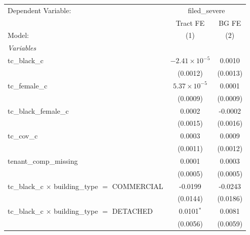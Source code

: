 \begin{tabular}{lcc}
   \tabularnewline \midrule \midrule
   Dependent Variable: & \multicolumn{2}{c}{filed\_severe}\\
                                                                       & Tract FE               & BG FE \\   
   Model:                                                              & (1)                    & (2)\\  
   \midrule
   \emph{Variables}\\
   tc\_black\_c                                                        & $-2.41\times 10^{-5}$  & 0.0010\\   
                                                                       & (0.0012)               & (0.0013)\\   
   tc\_female\_c                                                       & $5.37\times 10^{-5}$   & 0.0001\\   
                                                                       & (0.0009)               & (0.0009)\\   
   tc\_black\_female\_c                                                & 0.0002                 & -0.0002\\   
                                                                       & (0.0015)               & (0.0016)\\   
   tc\_cov\_c                                                          & 0.0003                 & 0.0009\\   
                                                                       & (0.0011)               & (0.0012)\\   
   tenant\_comp\_missing                                               & 0.0001                 & 0.0003\\   
                                                                       & (0.0005)               & (0.0005)\\   
   tc\_black\_c $\times$ building\_type $=$ COMMERCIAL                 & -0.0199                & -0.0243\\   
                                                                       & (0.0144)               & (0.0186)\\   
   tc\_black\_c $\times$ building\_type $=$ DETACHED                   & 0.0101$^{*}$           & 0.0081\\   
                                                                       & (0.0056)               & (0.0059)\\   

\end{tabular}
